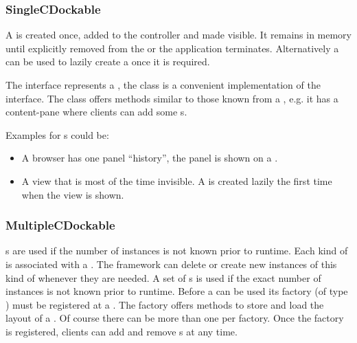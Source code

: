 
\subsubsection{SingleCDockable}
A  is created once, added to the controller and made visible. It remains in memory until explicitly removed from the  or the application terminates. Alternatively a  can be used to lazily create a  once it is required.

The interface  represents a , the class  is a convenient implementation of the interface. The class offers methods similar to those known from a , e.g. it has a content-pane where clients can add some s.

Examples for s could be:
\begin{itemize}
  \item A browser has one panel ``history'', the panel is shown on a \linebreak {}.
  \item A view that is most of the time invisible. A  is created lazily the first time when the view is shown.
\end{itemize}

\subsubsection{MultipleCDockable}
s are used if the number of instances is not known prior to runtime. Each kind of  is associated with a \linebreak {}. The framework can delete or create new instances of this kind of  whenever they are needed.
A set of s is used if the exact number of instances is not known prior to runtime. Before a  can be used its factory (of type ) must be registered at a . The factory offers methods to store and load the layout of a . Of course there can be more than one  per factory. Once the factory is registered, clients can add and remove \linebreak {}s at any time.


